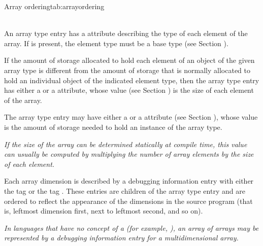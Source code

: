 {\begin{simplenametable}[1.8in]{Array ordering}{tab:arrayordering}
\DWORDcolmajorTARG{} \\
\DWORDrowmajorTARG{} \\
\end{simplenametable}

An array type entry has 
a \DWATtype{} attribute describing
the type of each element of the array.
\bb
If \DWATtensor{} is present, the element type must be a 
base type (see Section ).
\eb

If the amount of storage allocated to hold each element of an
object of the given array type is different from the amount
of storage that is normally allocated to hold an individual object
of\hypertarget{chap:DWATbitstridearrayelementstrideofarraytype}{}
the\hypertarget{chap:DWATbytestridearrayelementstrideofarraytype}{}
indicated element type, then the array type entry has either a
\DWATbytestrideDEFN{} 
or a
\DWATbitstrideDEFN{}
attribute, whose value 
(see Section ) 
is the size of each
element of the array.

The array type entry may have either a \DWATbytesize{} or a
\DWATbitsize{} attribute 
(see Section ), 
whose value is the
amount of storage needed to hold an instance of the array type.

\textit{If the size of the array can be determined statically at
compile time, this value can usually be computed by multiplying
the number of array elements by the size of each element.}

Each array dimension is described by a debugging information
entry with either the 
tag \DWTAGsubrangetype{} or the 
tag
\DWTAGenumerationtype. These entries are
children of the
array type entry and are ordered to reflect the appearance of
the dimensions in the source program (that is, leftmost dimension
first, next to leftmost second, and so on).

\textit{In languages that have no concept of a 
 (for example, 
), an array of arrays may
be represented by a debugging information entry for a
multidimensional array.}

}
